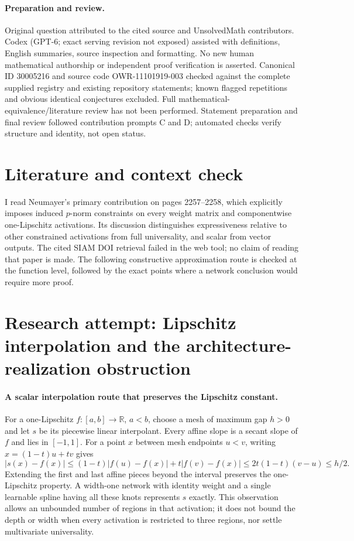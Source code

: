\documentclass[11pt]{article}
\begin{document}
\paragraph{Preparation and review.}
Original question attributed to the cited source and UnsolvedMath contributors. Codex (GPT-6; exact serving revision not exposed) assisted with definitions, English summaries, source inspection and formatting. No new human mathematical authorship or independent proof verification is asserted. Canonical ID 30005216 and source code OWR-11101919-003 checked against the complete supplied registry and existing repository statements; known flagged repetitions and obvious identical conjectures excluded. Full mathematical-equivalence/literature review has not been performed. Statement preparation and final review followed contribution prompts C and D; automated checks verify structure and identity, not open status.
\label{end:30005216}

\section{Literature and context check}

I read Neumayer's primary contribution on pages 2257--2258, which explicitly
imposes induced $p$-norm constraints on every weight matrix and componentwise
one-Lipschitz activations. Its discussion distinguishes expressiveness relative
to other constrained activations from full universality, and scalar from vector
outputs. The cited SIAM DOI retrieval failed in the web tool; no claim of reading
that paper is made. The following constructive approximation route is checked
at the function level, followed by the exact points where a network conclusion
would require more proof.

\section{Research attempt: Lipschitz interpolation and the architecture-realization obstruction}

\paragraph{A scalar interpolation route that preserves the Lipschitz constant.}
For a one-Lipschitz $f:[a,b]\to\mathbb R$, $a<b$, choose a mesh of maximum
gap $h>0$ and let $s$ be its piecewise linear interpolant. Every affine slope
is a secant slope of $f$ and lies in $[-1,1]$. For a point $x$ between mesh
endpoints $u<v$, writing $x=(1-t)u+tv$ gives
\[
 |s(x)-f(x)|\leq(1-t)|f(u)-f(x)|+t|f(v)-f(x)|
 \leq2t(1-t)(v-u)\leq h/2.
\]
Extending the first and last affine pieces beyond the interval preserves the
one-Lipschitz property. A width-one network with identity weight and a single
learnable spline having all these knots represents $s$ exactly.
This observation allows an unbounded number of regions in that activation;
it does not bound the depth or width when every activation is restricted to
three regions, nor settle multivariate universality.
\end{document}
